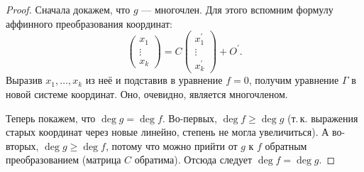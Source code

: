 \begin{proof}
    Сначала докажем, что $g$ --- многочлен. Для этого вспомним формулу аффинного преобразования координат:
    $$
    \begin{pmatrix}
        x_1\\
        \vdots\\
        x_k
    \end{pmatrix} = C
    \begin{pmatrix}
        x_1^\prime\\
        \vdots\\
        x_k^\prime
    \end{pmatrix} + O^\prime.
    $$
    Выразив $x_1, \ldots, x_k$ из неё и подставив в уравнение $f = 0$, получим уравнение $\Gamma$ в новой системе координат. Оно, очевидно, является многочленом.

    Теперь покажем, что $\deg g = \deg f$. Во-первых, $\deg f \geqslant \deg g$ (т.\,к. выражения старых координат через новые линейно, степень не могла увеличиться). А во-вторых, $\deg g \geqslant \deg f$, потому что можно прийти от $g$ к $f$ обратным преобразованием (матрица $C$ обратима). Отсюда следует $\deg f = \deg g$.
\end{proof}


